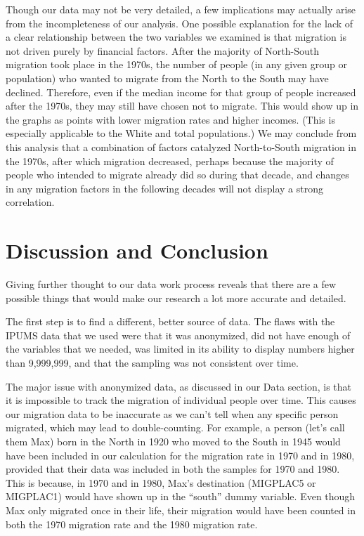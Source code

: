 \documentclass[12pt]{article}
\begin{document}
Though our data may not be very detailed, a few implications may actually arise from the incompleteness of our analysis. One possible explanation for the lack of a clear relationship between the two variables we examined is that migration is not driven purely by financial factors. After the majority of North-South migration took place in the 1970s, the number of people (in any given group or population) who wanted to migrate from the North to the South may have declined. Therefore, even if the median income for that group of people increased after the 1970s, they may still have chosen not to migrate. This would show up in the graphs as points with lower migration rates and higher incomes. (This is especially applicable to the White and total populations.) We may conclude from this analysis that a combination of factors catalyzed North-to-South migration in the 1970s, after which migration decreased, perhaps because the majority of people who intended to migrate already did so during that decade, and changes in any migration factors in the following decades will not display a strong correlation. 

\section{Discussion and Conclusion}
\label{sec:discussion}

Giving further thought to our data work process reveals that there are a few possible things that would make our research a lot more accurate and detailed. 

The first step is to find a different, better source of data. The flaws with the IPUMS data that we used were that it was anonymized, did not have enough of the variables that we needed, was limited in its ability to display numbers higher than 9,999,999, and that the sampling was not consistent over time. 

The major issue with anonymized data, as discussed in our Data section, is that it is impossible to track the migration of individual people over time. This causes our migration data to be inaccurate as we can’t tell when any specific person migrated, which may lead to double-counting. For example, a person (let’s call them Max) born in the North in 1920 who moved to the South in 1945 would have been included in our calculation for the migration rate in 1970 and in 1980, provided that their data was included in both the samples for 1970 and 1980. This is because, in 1970 and in 1980, Max’s destination (MIGPLAC5 or MIGPLAC1) would have shown up in the “south” dummy variable. Even though Max only migrated once in their life, their migration would have been counted in both the 1970 migration rate and the 1980 migration rate. 
\end{document}
